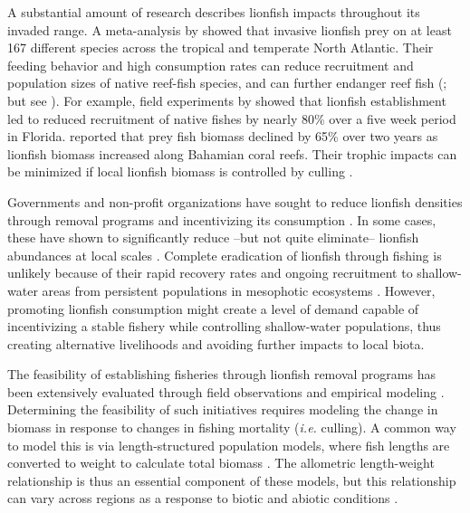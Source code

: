 \documentclass[12pt,]{article}
\theoremstyle{definition}
\theoremstyle{definition}
\theoremstyle{definition}
\theoremstyle{remark}
\begin{document}
A substantial amount of research describes lionfish impacts throughout
its invaded range. A meta-analysis by \citet{peake_2018} showed that
invasive lionfish prey on at least 167 different species across the
tropical and temperate North Atlantic. Their feeding behavior and high
consumption rates can reduce recruitment and population sizes of native
reef-fish species, and can further endanger reef fish
(\citet{green_2012,rocha_2015}; but see \citet{hackerott_2017}). For
example, field experiments by \citet{albins_2008} showed that lionfish
establishment led to reduced recruitment of native fishes by nearly 80\%
over a five week period in Florida. \citet{green_2012} reported that
prey fish biomass declined by 65\% over two years as lionfish biomass
increased along Bahamian coral reefs. Their trophic impacts can be
minimized if local lionfish biomass is controlled by culling
\citep{ariasgonzalez_2011}.

Governments and non-profit organizations have sought to reduce lionfish
densities through removal programs and incentivizing its consumption
\citep{chin_2016}. In some cases, these have shown to significantly
reduce --but not quite eliminate-- lionfish abundances at local scales
\citep{deleon_2013,sandel_2015}. Complete eradication of lionfish
through fishing is unlikely because of their rapid recovery rates and
ongoing recruitment to shallow-water areas from persistent populations
in mesophotic ecosystems \citep{barbour_2011,andradibrown_2017}.
However, promoting lionfish consumption might create a level of demand
capable of incentivizing a stable fishery while controlling
shallow-water populations, thus creating alternative livelihoods and
avoiding further impacts to local biota.

The feasibility of establishing fisheries through lionfish removal
programs has been extensively evaluated through field observations and
empirical modeling
\citep{barbour_2011,morris_2011,deleon_2013,johnston_2015,sandel_2015,usseglio_2017}.
Determining the feasibility of such initiatives requires modeling the
change in biomass in response to changes in fishing mortality
(\emph{i.e.} culling). A common way to model this is via
length-structured population models, where fish lengths are converted to
weight to calculate total biomass
\citep{barbour_2011,cote_2014,andradibrown_2017}. The allometric
length-weight relationship is thus an essential component of these
models, but this relationship can vary across regions as a response to
biotic and abiotic conditions \citep{johnson_2016}.
\end{document}
